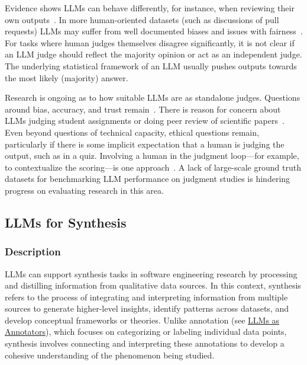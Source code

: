 Evidence shows LLMs can behave differently, for instance, when reviewing their own outputs~\cite{NEURIPS2024_7f1f0218}. In more human-oriented datasets (such as discussions of pull requests) LLMs may suffer from well documented biases and issues with fairness~\cite{Gallegos2024BiasAF}. 
For tasks where human judges themselves disagree significantly, it is not clear if an LLM judge should reflect the majority opinion or act as an independent judge. The underlying statistical framework of an LLM usually pushes outputs towards the most likely (majority) answer. 

Research is ongoing as to how suitable LLMs are as standalone judges. Questions around bias, accuracy, and trust remain~\cite{DBLP:journals/corr/abs-2406-18403}. There is reason for concern about LLMs judging student assignments or doing peer review of scientific papers~\cite{DBLP:conf/coling/ZhouC024}. Even beyond questions of technical capacity, ethical questions remain, particularly if there is some implicit expectation that a human is judging the output, such as in a quiz. Involving a human in the judgment loop---for example, to contextualize the scoring---is one approach~\cite{panHumanCenteredDesignRecommendations2024}. 
A lack of large-scale ground truth datasets for benchmarking LLM performance on judgment studies is hindering progress on evaluating research in this area.

\subsection{LLMs for Synthesis}

\subsubsection{Description}

LLMs can support synthesis tasks in software engineering research by processing and distilling information from qualitative data sources.
In this context, synthesis refers to the process of integrating and interpreting information from multiple sources to generate higher-level insights, identify patterns across datasets, and develop conceptual frameworks or theories. Unlike annotation (see \href{/study-types/#llms-as-annotators}{LLMs as Annotators}), which focuses on categorizing or labeling individual data points, synthesis involves connecting and interpreting these annotations to develop a cohesive understanding of the phenomenon being studied.

